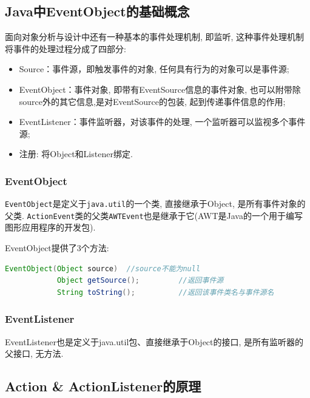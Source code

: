 \documentclass[12pt, a4paper, oneside]{ctexart}
\begin{document}
\subsection{Java中EventObject的基础概念}

    面向对象分析与设计中还有一种基本的事件处理机制, 即监听, 这种事件处理机制将事件的处理过程分成了四部分: 
    \begin{itemize}
        \item Source：事件源，即触发事件的对象, 任何具有行为的对象可以是事件源; 
        \item EventObject：事件对象, 即带有EventSource信息的事件对象, 也可以附带除source外的其它信息,是对EventSource的包装,  起到传递事件信息的作用; 
        \item EventListener：事件监听器，对该事件的处理, 一个监听器可以监视多个事件源; 
        \item 注册: 将Object和Listener绑定. 
    \end{itemize}

    \subsubsection{EventObject}

        \lstinline{EventObject}是定义于\lstinline{java.util}的一个类, 直接继承于Object, 是所有事件对象的父类. 
        \lstinline{ActionEvent}类的父类\lstinline{AWTEvent}也是继承于它(AWT是Java的一个用于编写图形应用程序的开发包). 

        EventObject提供了3个方法: 
        \begin{lstlisting}[language = Java]
            EventObject(Object source)  //source不能为null
            Object getSource();         //返回事件源
            String toString();          //返回该事件类名与事件源名    
        \end{lstlisting}

    \subsubsection{EventListener}

        EventListener也是定义于java.util包、直接继承于Object的接口, 是所有监听器的父接口, 无方法.

\subsection{Action \& ActionListener的原理}
\end{document}
